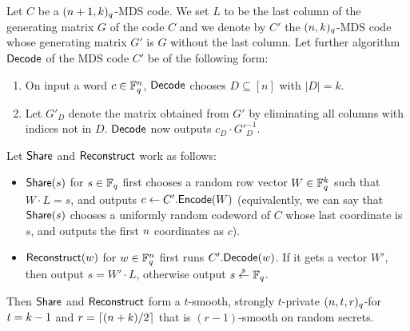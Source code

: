\begin{lemma}\label{MDSisSeparableRSS}
Let $C$ be a $(n+1,k)_q$-MDS code.
We set $L$ to be the last column of the generating matrix $G$ of the code $C$ and we denote by $C'$ the $(n,k)_q$-MDS code whose generating matrix $G'$ is $G$ without the last column. Let further algorithm $\mathsf{Decode}$ of the MDS code $C'$ be of the following form:
\begin{enumerate}
 \item On input a word $c\in\mathbb{F}_q^{n}$, $\mathsf{Decode}$ chooses $D\subseteq[n]$ with $|D|=k$. 
 \item Let $G'_D$ denote the matrix obtained from $G'$ by eliminating all columns with indices not in $D$. $\mathsf{Decode}$ now outputs $c_D\cdot G'^{-1}_D$.
\end{enumerate}
Let $\mathsf{Share}$ and $\mathsf{Reconstruct}$ work as follows:
\begin{itemize}
\item $\mathsf{Share}(s)$ for $s\in\mathbb{F}_q$ first chooses a random row vector $W\in\mathbb{F}_q^{k}$ such that $W \cdot L = s$, and outputs $c \gets C'.\mathsf{Encode}(W)$ (equivalently, we can say that $\mathsf{Share}(s)$ chooses a uniformly random codeword of $C$ whose last coordinate is $s$, and outputs the first $n$ coordinates as $c$).
\item $\mathsf{Reconstruct}(w)$ for $w\in\mathbb{F}_q^{n}$ first runs $C'.\mathsf{Decode}(w)$. If it gets a vector $W'$, then output $s = W' \cdot L$, otherwise output $s\stackrel{{}_\$}{\leftarrow} \mathbb{F}_q$.
\end{itemize}
Then $\mathsf{Share}$ and $\mathsf{Reconstruct}$ form a $t$-smooth, strongly $t$-private $(n,t,r)_q$-\RSS for $t=k-1$ and $r = \lceil(n+k)/2\rceil$ that is $(r-1)$-smooth on random secrets.
\end{lemma}
